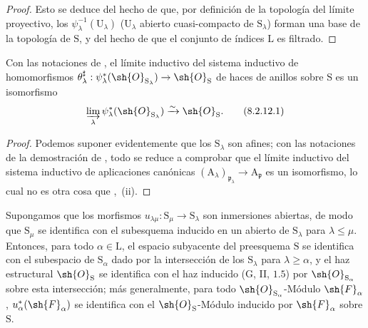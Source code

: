 \begin{proof}
Esto se deduce del hecho de que, por definición de la topología del límite proyectivo, los $\psi_\lambda^{-1}(\mathrm{U}_\lambda)$ ($\mathrm{U}_\lambda$ abierto cuasi-compacto de $\mathrm{S}_\lambda$) forman una base de la topología de $\mathrm{S}$, y del hecho de que el conjunto de índices $\mathrm{L}$ es filtrado.
\end{proof}

\begin{corollary}[8.2.12]
\label{IV.8.2.12}
Con las notaciones de , el límite inductivo del sistema inductivo de homomorfismos $\theta_\lambda^\sharp:\psi_\lambda^*(\sh{O}_{\mathrm{S}_\lambda})\to\sh{O}_\mathrm{S}$ de haces de anillos sobre $\mathrm{S}$ es un isomorfismo
\begin{equation}
  \varinjlim_\lambda\psi_\lambda^*(\sh{O}_{\mathrm{S}_\lambda})\xrightarrow{\sim}\sh{O}_\mathrm{S}.
  \label{IV.8.2.12.1}
\tag{8.2.12.1}
\end{equation}
\end{corollary}

\begin{proof}
Podemos suponer evidentemente que los $\mathrm{S}_\lambda$ son afines; con las notaciones de la demostración de , todo se reduce a comprobar que el límite inductivo del sistema inductivo de aplicaciones canónicas $(\mathrm{A}_\lambda)_{\mathfrak{p}_\lambda}\to\mathrm{A}_\mathfrak{p}$ es un isomorfismo, lo cual no es otra cosa que ,~(ii).
\end{proof}

\begin{proposition}[8.2.13]
\label{IV.8.2.13}
Supongamos que los morfismos $u_{\lambda\mu}:\mathrm{S}_\mu\to\mathrm{S}_\lambda$ son inmersiones abiertas, de modo que $\mathrm{S}_\mu$ se identifica con el subesquema inducido en un abierto de $\mathrm{S}_\lambda$ para $\lambda\leqslant\mu$.
Entonces, para todo $\alpha\in\mathrm{L}$, el espacio subyacente del preesquema $\mathrm{S}$ se identifica con el subespacio de $\mathrm{S}_\alpha$ dado por la intersección de los $\mathrm{S}_\lambda$ para $\lambda\geqslant\alpha$, y el haz estructural $\sh{O}_\mathrm{S}$ se identifica con el haz inducido \textnormal{(}$\mathrm{G}$, II, $1.5$\textnormal{)} por $\sh{O}_{\mathrm{S}_\alpha}$ sobre esta intersección; más generalmente, para todo $\sh{O}_{\mathrm{S}_\alpha}$-Módulo $\sh{F}_\alpha$, $u_\alpha^*(\sh{F}_\alpha)$ se identifica con el $\sh{O}_\mathrm{S}$-Módulo inducido por $\sh{F}_\alpha$ sobre $\mathrm{S}$.
\end{proposition}

